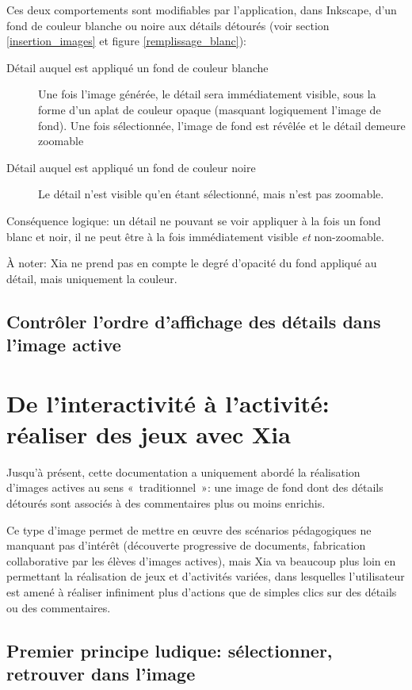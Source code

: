 \documentclass[a4paper,12pt]{report}
\begin{document}
Ces deux comportements sont modifiables par l'application, dans Inkscape, d'un fond de couleur blanche ou noire
aux détails détourés (voir section \ref{insertion_images} et figure \ref{remplissage_blanc}):
\begin{description}
 \item [Détail auquel est appliqué un fond de couleur blanche] Une fois l'image générée, 
 le détail sera immédiatement visible, sous la forme d'un aplat de couleur opaque (masquant
 logiquement l'image de fond). Une fois sélectionnée, l'image de fond est révêlée et le détail demeure zoomable
 \item [Détail auquel est appliqué un fond de couleur noire] Le détail n'est visible qu'en étant sélectionné, mais
 n'est pas zoomable.
\end{description}

Conséquence logique: un détail ne pouvant se voir appliquer à la fois un fond blanc et noir, il ne peut être à la
fois immédiatement visible \textit{et} non-zoomable.

À noter: Xia ne prend pas en compte le degré d'opacité du fond appliqué au détail, mais uniquement la couleur.

\subsection{Contrôler l'ordre d'affichage des détails dans l'image active}


\section{De l'interactivité à l'activité: réaliser des jeux avec Xia}

Jusqu'à présent, cette documentation a uniquement abordé la réalisation d'images actives au sens «~traditionnel~»:
une image de fond dont des détails détourés sont associés à des commentaires plus ou moins enrichis.

Ce type d'image permet de mettre en œuvre des scénarios pédagogiques ne manquant pas d'intérêt 
(découverte progressive de documents, fabrication collaborative par les élèves d'images actives), 
mais Xia va beaucoup plus loin en permettant la réalisation de jeux et d'activités variées, dans lesquelles
l'utilisateur est amené à réaliser infiniment plus d'actions que de simples clics sur des détails ou des commentaires.

\subsection{Premier principe ludique: sélectionner, retrouver dans l'image}
\end{document}

